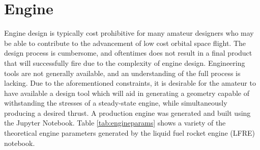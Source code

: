 \documentclass[]{aiaa-tc}%
\begin{document}


\section{Engine}



Engine design is typically cost prohibitive for many amateur designers who may be able to contribute to the advancement of low cost orbital space flight. The design process is cumbersome, and oftentimes does not result in a final product that will successfully fire due to the complexity of engine design. Engineering tools are not generally available, and an understanding of the full process is lacking. Due to the aforementioned constraints, it is desirable for the amateur to have available a design tool which will aid in generating a geometry capable of withstanding the stresses of a steady-state engine, while simultaneously producing a desired thrust. A production engine was generated and built using the Jupyter Notebook. Table \ref{tab:engineparams} shows a variety of the theoretical engine parameters generated by the liquid fuel rocket engine (LFRE) notebook.
\end{document}

